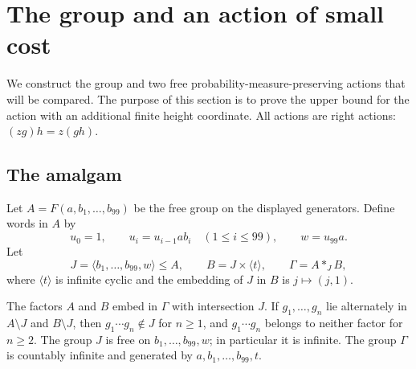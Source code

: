 \section{The group and an action of small cost}
\label{actions:section}

We construct the group and two free probability-measure-preserving actions
that will be compared.  The purpose of this section is to prove the upper
bound for the action with an additional finite height coordinate.
All actions are right actions: $(zg)h=z(gh)$.

\subsection{The amalgam}

Let $A=F(a,b_1,\ldots,b_{99})$ be the free group on the
displayed generators.  Define words in $A$ by
\[
 u_0=1,\qquad u_i=u_{i-1}ab_i\quad(1\leq i\leq99),
 \qquad w=u_{99}a.
\]
Let
\begin{equation}
 \label{actions:group}
 J=\langle b_1,\ldots,b_{99},w\rangle\leq A,
 \qquad B=J\times\langle t\rangle,
 \qquad \Gamma=A*_J B,
\end{equation}
where $\langle t\rangle$ is infinite cyclic and the embedding of $J$ in
$B$ is $j\mapsto(j,1)$.

\begin{lemma}
\label{actions:normal-form}
The factors $A$ and $B$ embed in $\Gamma$ with intersection $J$.
If $g_1,\ldots,g_n$ lie alternately in $A\setminus J$ and
$B\setminus J$, then $g_1\cdots g_n\notin J$ for $n\geq1$, and
$g_1\cdots g_n$ belongs to neither factor for $n\geq2$.
The group $J$ is free on $b_1,\ldots,b_{99},w$; in particular it is
infinite.  The group $\Gamma$ is countably infinite and generated by
$a,b_1,\ldots,b_{99},t$.
\end{lemma}

